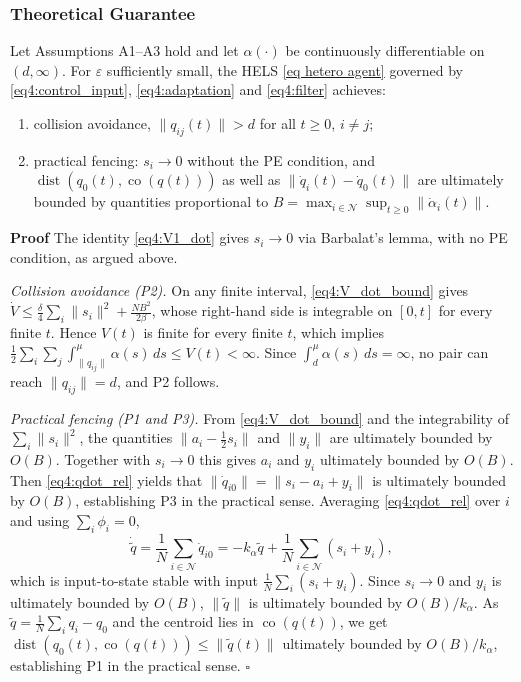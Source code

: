 \subsubsection{Theoretical Guarantee}

\begin{theorem}
	Let Assumptions A1--A3 hold and let $\alpha(\cdot)$ be continuously differentiable on
	$(d,\infty)$. For $\varepsilon$ sufficiently small, the HELS \eqref{eq hetero agent}
	governed by \eqref{eq4:control_input}, \eqref{eq4:adaptation} and \eqref{eq4:filter}
	achieves:
	\begin{enumerate}
		\item[\textbf{P2}] collision avoidance, $\|q_{ij}(t)\| > d$ for all $t \ge 0$, $i\neq j$;
		\item[\textbf{P1}, \textbf{P3}] practical fencing: $s_i\to 0$ without the PE condition,
			and $\operatorname{dist}(q_0(t), \operatorname{co}(q(t)))$ as well as
			$\|\dot{q}_i(t)-\dot{q}_0(t)\|$ are ultimately bounded by quantities proportional
			to $B = \max_{i\in\mathcal{N}} \sup_{t\ge0}\|\dot{\alpha}_i(t)\|$.
	\end{enumerate}
\end{theorem}

\noindent\textbf{Proof}
The identity \eqref{eq4:V1_dot} gives $s_i\to0$ via Barbalat's lemma, with no PE condition,
as argued above.

\noindent\textit{Collision avoidance (P2).}
On any finite interval, \eqref{eq4:V_dot_bound} gives
$\dot{V} \le \tfrac{\delta}{4}\sum_i\|s_i\|^2 + \tfrac{NB^2}{2\beta}$, whose right-hand side
is integrable on $[0,t]$ for every finite $t$. Hence $V(t)$ is finite for every finite $t$,
which implies
$\frac12\sum_{i}\sum_{j}\int_{\|q_{ij}\|}^{\mu}\alpha(s)\,ds \le V(t) < \infty$.
Since $\int_{d}^{\mu}\alpha(s)\,ds = \infty$, no pair can reach $\|q_{ij}\|=d$, and P2
follows.

\noindent\textit{Practical fencing (P1 and P3).}
From \eqref{eq4:V_dot_bound} and the integrability of $\sum_i\|s_i\|^2$, the quantities
$\|a_i-\tfrac12 s_i\|$ and $\|y_i\|$ are ultimately bounded by $O(B)$. Together with
$s_i\to0$ this gives $a_i$ and $y_i$ ultimately bounded by $O(B)$. Then
\eqref{eq4:qdot_rel} yields that $\|\dot{q}_{i0}\| = \|s_i - a_i + y_i\|$ is ultimately
bounded by $O(B)$, establishing P3 in the practical sense.
Averaging \eqref{eq4:qdot_rel} over $i$ and using $\sum_i\phi_i=0$,
\begin{equation*}
	\dot{\tilde{q}} = \frac{1}{N}\sum_{i\in\mathcal{N}}\dot{q}_{i0}
	= -k_\alpha\tilde{q} + \frac{1}{N}\sum_{i\in\mathcal{N}}(s_i + y_i),
\end{equation*}
which is input-to-state stable with input $\frac1N\sum_i(s_i+y_i)$. Since $s_i\to0$ and
$y_i$ is ultimately bounded by $O(B)$, $\|\tilde{q}\|$ is ultimately bounded by $O(B)/k_\alpha$.
As $\tilde{q} = \frac1N\sum_i q_i - q_0$ and the centroid lies in $\operatorname{co}(q(t))$,
we get
$\operatorname{dist}(q_0(t), \operatorname{co}(q(t))) \le \|\tilde{q}(t)\|$ ultimately
bounded by $O(B)/k_\alpha$, establishing P1 in the practical sense.
\hfill$\square$
